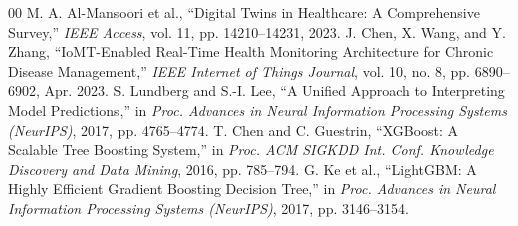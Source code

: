 \documentclass[conference]{IEEEtran}
\begin{document}
\begin{thebibliography}{00}
 M. A. Al-Mansoori et al., ``Digital Twins in Healthcare: A Comprehensive Survey,'' \textit{IEEE Access}, vol. 11, pp. 14210--14231, 2023.
 J. Chen, X. Wang, and Y. Zhang, ``IoMT-Enabled Real-Time Health Monitoring Architecture for Chronic Disease Management,'' \textit{IEEE Internet of Things Journal}, vol. 10, no. 8, pp. 6890--6902, Apr. 2023.
 S. Lundberg and S.-I. Lee, ``A Unified Approach to Interpreting Model Predictions,'' in \textit{Proc. Advances in Neural Information Processing Systems (NeurIPS)}, 2017, pp. 4765--4774.
 T. Chen and C. Guestrin, ``XGBoost: A Scalable Tree Boosting System,'' in \textit{Proc. ACM SIGKDD Int. Conf. Knowledge Discovery and Data Mining}, 2016, pp. 785--794.
 G. Ke et al., ``LightGBM: A Highly Efficient Gradient Boosting Decision Tree,'' in \textit{Proc. Advances in Neural Information Processing Systems (NeurIPS)}, 2017, pp. 3146--3154.
\end{thebibliography}
\end{document}
